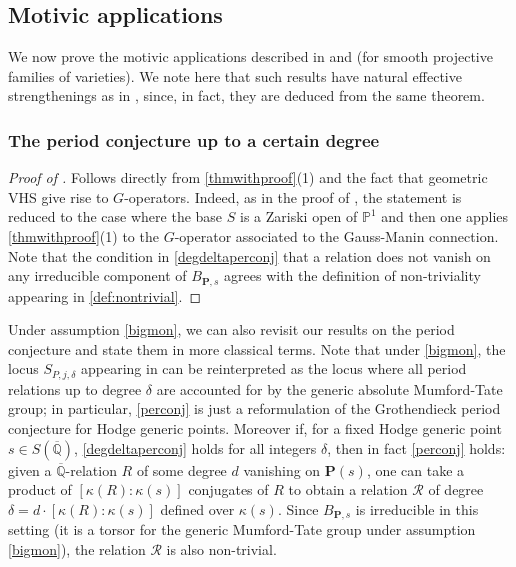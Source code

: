\documentclass[10pt]{article}
\numberwithin{equation}{section}
\theoremstyle{plain}
\theoremstyle{definition}
\theoremstyle{remark}
\newcommand{\Qbar}{\overline{\mathbb{Q}}}
\begin{document}
\subsection{Motivic applications}
We now prove the motivic applications described in  and  (for smooth projective families of varieties). We note here that such results have natural effective strengthenings as in , since, in fact, they are deduced from the same theorem.

\subsubsection{The period conjecture up to a certain degree}\label{proofperiod}

\begin{proof}[Proof of ]
    Follows directly from \autoref{thmwithproof}(1) and the fact that geometric VHS give rise to $G$-operators. Indeed, as in the proof of , the statement is reduced to the case where the base $S$ is a Zariski open of $\mathbb{P}^1$ and then one applies \autoref{thmwithproof}(1) to the $G$-operator associated to the Gauss-Manin connection. Note that the condition in \autoref{degdeltaperconj} that a relation does not vanish on any irreducible component of $B_{\mathbf{P},s}$ agrees with the definition of non-triviality appearing in \autoref{def:nontrivial}.
\end{proof}

Under assumption \eqref{bigmon}, we can also revisit our results on the period conjecture and state them in more classical terms. Note that under \eqref{bigmon}, the locus $S_{P,j,\delta}$ appearing in  can be reinterpreted as the locus where all period relations up to degree $\delta$ are accounted for by the generic absolute Mumford-Tate group; in particular, \autoref{perconj} is just a reformulation of the Grothendieck period conjecture for Hodge generic points. Moreover if, for a fixed Hodge generic point $s \in S(\Qbar)$, \autoref{degdeltaperconj} holds for all integers $\delta$, then in fact \autoref{perconj} holds: given a $\Qbar$-relation $R$ of some degree $d$ vanishing on $\mathbf{P}(s)$, one can take a product of $[\kappa(R) : \kappa(s)]$ conjugates of $R$ to obtain a relation $\mathcal{R}$ of degree $\delta = d \cdot [\kappa(R) : \kappa(s)]$ defined over $\kappa(s)$. Since $B_{\mathbf{P
},s}$ is irreducible in this setting (it is a torsor for the generic Mumford-Tate group under assumption \eqref{bigmon}), the relation $\mathcal{R}$ is also non-trivial.
\end{document}
